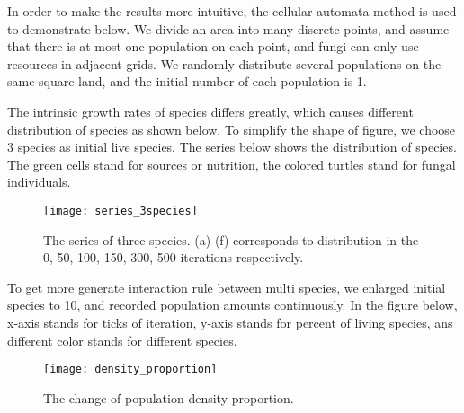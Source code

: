 \documentclass{mcmthesis}
\begin{document}






In order to make the results more intuitive, the cellular automata method is used to demonstrate below. We divide an area into many discrete points, and assume that there is at most one population on each point, and fungi can only use resources in adjacent grids. We randomly distribute several populations on the same square land, and the initial number of each population is 1.

The intrinsic growth rates of species differs greatly, which causes different distribution of species as shown below. To simplify the shape of figure, we choose 3 species as initial live species. The series below shows the distribution of species. The green cells stand for sources or nutrition, the colored turtles stand for fungal individuals.

\begin{figure}[H]
  \small
  \centering
  \texttt{[image: series\_3species]}
  \caption{The series of three species. (a)-(f) corresponds to distribution in the 0, 50, 100, 150, 300, 500 iterations respectively.}
  \label{series_3species}
\end{figure}

To get more generate interaction rule between multi species, we enlarged initial species to 10, and recorded population amounts continuously. In the figure below, x-axis stands for ticks of iteration, y-axis stands for percent of living species, ans different color stands for different species.

\begin{figure}[H]
  \small
  \centering
  \texttt{[image: density\_proportion]}
  \caption{The change of population density proportion.}
  \label{density_proportion}
\end{figure}
\end{document}
